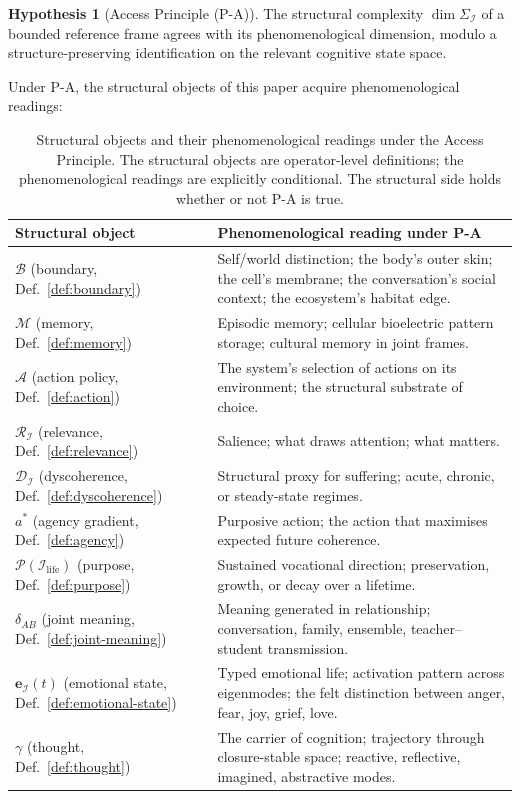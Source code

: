 \documentclass[11pt]{article}
\theoremstyle{plain}
\theoremstyle{definition}
\newtheorem{hypothesis}[theorem]{Hypothesis}
\theoremstyle{remark}
\newcommand{\Ical}{\mathcal{I}}
\newcommand{\Mcal}{\mathcal{M}}
\newcommand{\Acal}{\mathcal{A}}
\newcommand{\Bcal}{\mathcal{B}}
\newcommand{\Rcal}{\mathcal{R}}
\newcommand{\Dcal}{\mathcal{D}}
\newcommand{\Pcal}{\mathcal{P}}
\newcommand{\Ilife}{\Ical_{\mathrm{life}}}
\begin{document}
\begin{hypothesis}[Access Principle (P-A)]
The structural complexity $\dim \Sigma_\Ical$ of a bounded reference frame agrees with its phenomenological dimension, modulo a structure-preserving identification on the relevant cognitive state space.
\end{hypothesis}

Under P-A, the structural objects of this paper acquire phenomenological readings:

\begin{table}[h]
\centering
\small
\caption{Structural objects and their phenomenological readings under the Access Principle. The structural objects are operator-level definitions; the phenomenological readings are explicitly conditional. The structural side holds whether or not P-A is true.}\label{tab:phenom-bridge}
\begin{tabular}{p{4cm}p{8cm}}
\toprule
Structural object & Phenomenological reading under P-A \\
\midrule
$\Bcal$ (boundary, Def.~\ref{def:boundary}) & Self/world distinction; the body's outer skin; the cell's membrane; the conversation's social context; the ecosystem's habitat edge. \\
$\Mcal$ (memory, Def.~\ref{def:memory}) & Episodic memory; cellular bioelectric pattern storage; cultural memory in joint frames. \\
$\Acal$ (action policy, Def.~\ref{def:action}) & The system's selection of actions on its environment; the structural substrate of choice. \\
$\Rcal_\Ical$ (relevance, Def.~\ref{def:relevance}) & Salience; what draws attention; what matters. \\
$\Dcal_\Ical$ (dyscoherence, Def.~\ref{def:dyscoherence}) & Structural proxy for suffering; acute, chronic, or steady-state regimes. \\
$a^*$ (agency gradient, Def.~\ref{def:agency}) & Purposive action; the action that maximises expected future coherence. \\
$\Pcal(\Ilife)$ (purpose, Def.~\ref{def:purpose}) & Sustained vocational direction; preservation, growth, or decay over a lifetime. \\
$\delta_{AB}$ (joint meaning, Def.~\ref{def:joint-meaning}) & Meaning generated in relationship; conversation, family, ensemble, teacher--student transmission. \\
$\mathbf{e}_\Ical(t)$ (emotional state, Def.~\ref{def:emotional-state}) & Typed emotional life; activation pattern across eigenmodes; the felt distinction between anger, fear, joy, grief, love. \\
$\gamma$ (thought, Def.~\ref{def:thought}) & The carrier of cognition; trajectory through closure-stable space; reactive, reflective, imagined, abstractive modes. \\
\bottomrule
\end{tabular}
\end{table}
\end{document}
